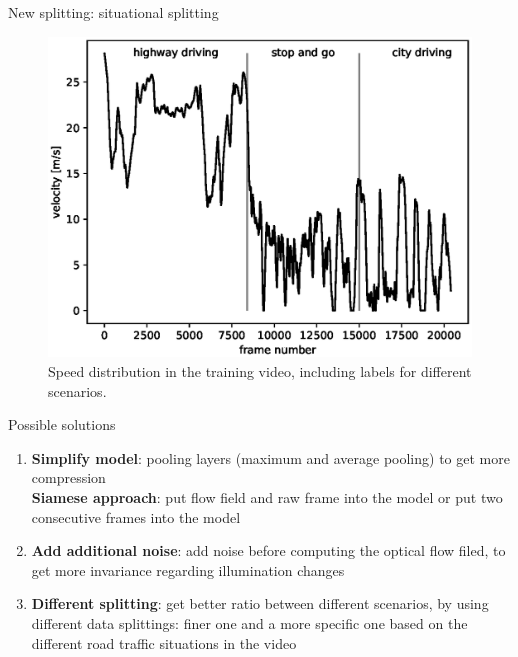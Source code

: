 \begin{frame}{New splitting: situational splitting}
\begin{figure}
\centering
\includegraphics[scale=0.5]{./imgs/plot_speed_time_new_splitting.eps}
\caption{Speed distribution in the training video, including labels for different scenarios.}
\end{figure}
\end{frame}


\begin{frame}{Possible solutions}
\begin{enumerate}
\item \textbf{Simplify model}: pooling layers (maximum and average pooling) to get more compression\\
\textbf{Siamese approach}: put flow field and raw frame into the model or put two consecutive frames into the model
\item \textbf{Add additional noise}: add noise before computing the optical flow filed, to get more invariance regarding illumination changes
\item \textbf{Different splitting}: get better ratio between different scenarios, by using different data splittings:
finer one and a more specific one based on the different road traffic situations in the video
\end{enumerate}
\end{frame}
